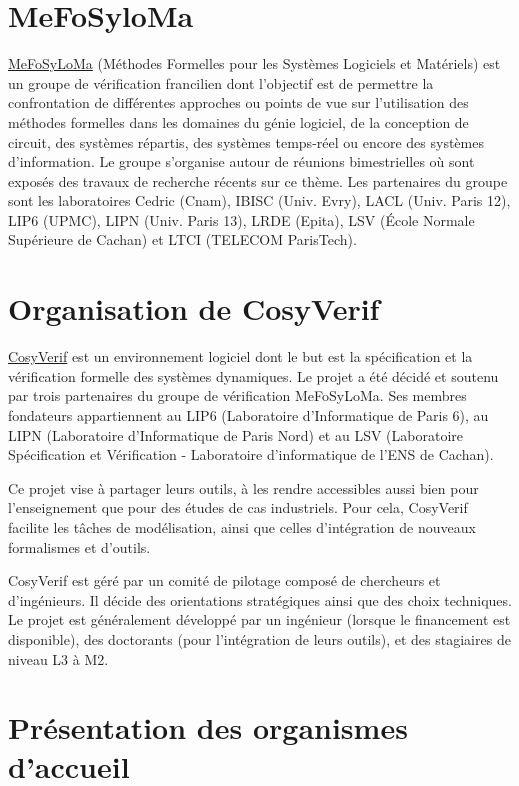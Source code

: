 \documentclass{report}
\begin{document}
\section{MeFoSyloMa}

\href{http://www.mefosyloma.fr/}{MeFoSyLoMa}
(Méthodes Formelles pour les Systèmes Logiciels et Matériels) est un groupe de vérification francilien dont
l'objectif est de permettre la confrontation de différentes approches ou points de vue sur l'utilisation des méthodes 
formelles dans les domaines du génie logiciel, de la conception de circuit, des systèmes répartis, des systèmes 
temps-réel ou encore des systèmes d'information. Le groupe s'organise autour de réunions bimestrielles où sont 
exposés des travaux de recherche récents sur ce thème. Les partenaires du groupe sont les laboratoires Cedric (Cnam), 
IBISC (Univ. Evry), LACL (Univ. Paris 12), LIP6 (UPMC), LIPN (Univ. Paris 13), LRDE (Epita), LSV (École Normale 
Supérieure de Cachan) et LTCI (TELECOM ParisTech).

\section{Organisation de CosyVerif}

\href{http://www.cosyverif.org}{CosyVerif} est un environnement logiciel dont le but est la spécification et la vérification
formelle des systèmes dynamiques. Le projet a été décidé et soutenu par
trois partenaires du groupe de vérification MeFoSyLoMa. Ses membres
fondateurs appartiennent au LIP6 (Laboratoire 
d'Informatique de Paris 6), au LIPN (Laboratoire d'Informatique de Paris
Nord) et au LSV (Laboratoire Spécification et 
Vérification - Laboratoire d'informatique de l'ENS de Cachan).

Ce projet vise à partager leurs outils, à les rendre accessibles aussi bien
pour l'enseignement que pour des études de cas industriels.
Pour cela, CosyVerif facilite les tâches de modélisation, ainsi que celles
d'intégration de nouveaux formalismes et d'outils.

CosyVerif est géré par un comité de pilotage composé de chercheurs et d'ingénieurs. Il décide des orientations 
stratégiques ainsi que des choix techniques.
Le projet est généralement développé par un ingénieur (lorsque le
financement est disponible), des doctorants (pour l'intégration de leurs
outils), et des stagiaires de niveau L3 à M2.

\section{Présentation des organismes d'accueil}
\end{document}
